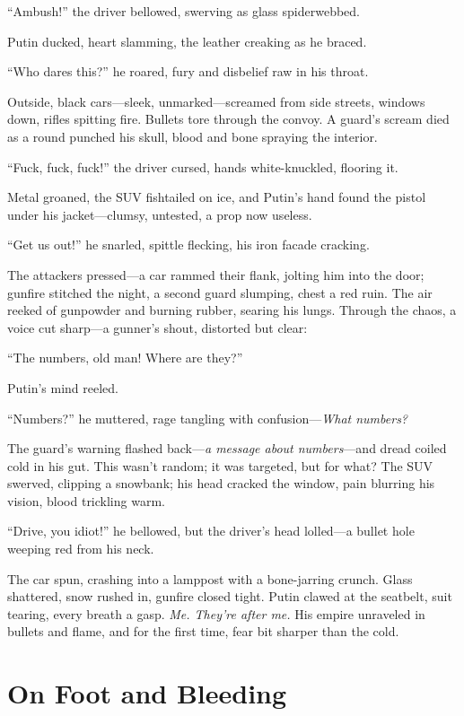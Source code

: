 \documentclass[12pt]{book}
\begin{document}
\enquote{Ambush!} the driver bellowed, swerving as glass spiderwebbed.

Putin ducked, heart slamming, the leather creaking as he braced.

\enquote{Who dares this?} he roared, fury and disbelief raw in his throat.

Outside, black cars---sleek, unmarked---screamed from side streets, windows down, rifles spitting fire. Bullets tore through the convoy. A guard’s scream died as a round punched his skull, blood and bone spraying the interior.

\enquote{Fuck, fuck, fuck!} the driver cursed, hands white-knuckled, flooring it.

Metal groaned, the SUV fishtailed on ice, and Putin’s hand found the pistol under his jacket---clumsy, untested, a prop now useless.

\enquote{Get us out!} he snarled, spittle flecking, his iron facade cracking.

The attackers pressed---a car rammed their flank, jolting him into the door; gunfire stitched the night, a second guard slumping, chest a red ruin. The air reeked of gunpowder and burning rubber, searing his lungs. Through the chaos, a voice cut sharp---a gunner’s shout, distorted but clear:

\enquote{The numbers, old man! Where are they?}

Putin’s mind reeled.

\enquote{Numbers?} he muttered, rage tangling with confusion---\textit{What numbers?}

The guard’s warning flashed back---\textit{a message about numbers}---and dread coiled cold in his gut. This wasn’t random; it was targeted, but for what? The SUV swerved, clipping a snowbank; his head cracked the window, pain blurring his vision, blood trickling warm.

\enquote{Drive, you idiot!} he bellowed, but the driver’s head lolled---a bullet hole weeping red from his neck.

The car spun, crashing into a lamppost with a bone-jarring crunch. Glass shattered, snow rushed in, gunfire closed tight. Putin clawed at the seatbelt, suit tearing, every breath a gasp. \textit{Me. They’re after me.} His empire unraveled in bullets and flame, and for the first time, fear bit sharper than the cold.


\section{On Foot and Bleeding}
\end{document}
